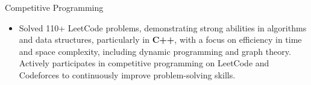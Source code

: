 \begin{rSection}{Competitive Programming}
  \begin{itemize}
      \item Solved 110+ LeetCode problems, demonstrating strong abilities in algorithms and data structures, particularly in \textbf{C++}, with a focus on efficiency in time and space complexity, including dynamic programming and graph theory. Actively participates in competitive programming on LeetCode and Codeforces to continuously improve problem-solving skills.
  \end{itemize}
  \end{rSection}

